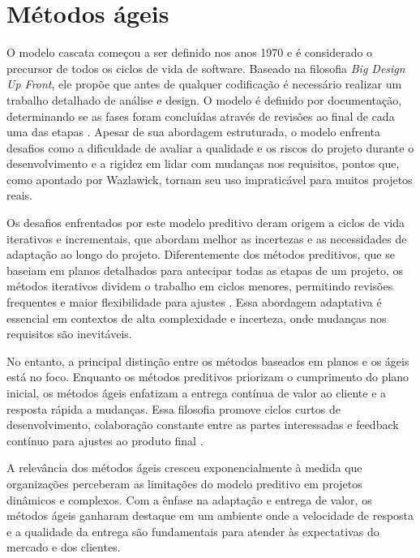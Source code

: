 \documentclass[
	12pt,
	openright,
	twoside,
	a4paper,
	english,
	brazil
	]{abntex2}
\begin{document}

\section{Métodos ágeis}

O modelo cascata começou a ser definido nos anos 1970 e é considerado o  precursor de todos os ciclos de vida de software. Baseado na filosofia \textit{Big Design Up Front}, ele propõe que antes de qualquer codificação  é necessário realizar um trabalho detalhado de análise e design. O modelo é definido por documentação, determinando se as fases foram concluídas através de revisões ao final de cada uma das etapas \cite{wazlawick2019}. Apesar de sua abordagem estruturada, o modelo enfrenta desafios como a dificuldade de avaliar a qualidade e os riscos do projeto durante o desenvolvimento e a rigidez em lidar com mudanças nos requisitos, pontos que, como apontado por Wazlawick, tornam seu uso impraticável para muitos projetos reais.

Os desafios enfrentados por este modelo preditivo deram origem a ciclos de vida iterativos e incrementais, que abordam melhor as incertezas e as necessidades de adaptação ao longo do projeto. Diferentemente dos métodos preditivos, que se baseiam em planos detalhados para antecipar todas as etapas de um projeto, os métodos iterativos dividem o trabalho em ciclos menores, permitindo revisões frequentes e maior flexibilidade para ajustes \cite{AgileGuide}. Essa abordagem adaptativa é essencial em contextos de alta complexidade e incerteza, onde mudanças nos requisitos são inevitáveis.

No entanto, a principal distinção entre os métodos baseados em planos e os ágeis está no foco. Enquanto os métodos preditivos priorizam o cumprimento do plano inicial, os métodos ágeis enfatizam a entrega contínua de valor ao cliente e a resposta rápida a mudanças. Essa filosofia promove ciclos curtos de desenvolvimento, colaboração constante entre as partes interessadas e feedback contínuo para ajustes ao produto final \cite{AgileGuide}.

A relevância dos métodos ágeis cresceu exponencialmente à medida que organizações perceberam as limitações do modelo preditivo em projetos dinâmicos e complexos. Com a ênfase na adaptação e entrega de valor, os métodos ágeis ganharam destaque em um ambiente onde a velocidade de resposta e a qualidade da entrega são fundamentais para atender às expectativas do mercado e dos clientes.
\end{document}
